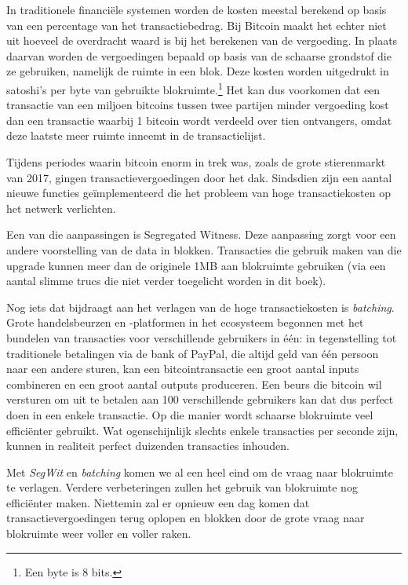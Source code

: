 In traditionele financiële systemen worden de kosten meestal berekend op basis van een percentage van het transactiebedrag. Bij Bitcoin maakt het echter niet uit hoeveel de overdracht waard is bij het berekenen van de vergoeding. In plaats daarvan worden de vergoedingen bepaald op basis van de schaarse grondstof die ze gebruiken, namelijk de ruimte in een blok. Deze kosten worden uitgedrukt in satoshi’s per byte van gebruikte blokruimte.\footnote{Een byte is 8 bits.} Het kan dus voorkomen dat een transactie van een miljoen bitcoins tussen twee partijen minder vergoeding kost dan een transactie waarbij 1 bitcoin wordt verdeeld over tien ontvangers, omdat deze laatste meer ruimte inneemt in de transactielijst.

Tijdens periodes waarin bitcoin enorm in trek was, zoals de grote stierenmarkt van 2017, gingen transactievergoedingen door het dak. Sindsdien zijn een aantal nieuwe functies geïmplementeerd die het probleem van hoge transactiekosten op het netwerk verlichten.

Een van die aanpassingen is \textquotedbl{}Segregated Witness\textquotedbl{}. Deze aanpassing zorgt voor een andere voorstelling van de data in blokken. Transacties die gebruik maken van die upgrade kunnen meer dan de originele 1MB aan blokruimte gebruiken (via een aantal slimme trucs die niet verder toegelicht worden in dit boek).

Nog iets dat bijdraagt aan het verlagen van de hoge transactiekosten is \textit{batching}. Grote handelsbeurzen en -platformen in het ecosysteem begonnen met het bundelen van transacties voor verschillende gebruikers in één: in tegenstelling tot traditionele betalingen via de bank of PayPal, die altijd geld van één persoon naar een andere sturen, kan een bitcointransactie een groot aantal inputs combineren en een groot aantal outputs produceren. Een beurs die bitcoin wil versturen om uit te betalen aan 100 verschillende gebruikers kan dat dus perfect doen in een enkele transactie. Op die manier wordt schaarse blokruimte veel efficiënter gebruikt. Wat ogenschijnlijk slechts enkele transacties per seconde zijn, kunnen in realiteit perfect duizenden transacties inhouden.

Met \textit{SegWit} en \textit{batching} komen we al een heel eind om de vraag naar blokruimte te verlagen. Verdere verbeteringen zullen het gebruik van blokruimte nog efficiënter maken. Niettemin zal er opnieuw een dag komen dat transactievergoedingen terug oplopen en blokken door de grote vraag naar blokruimte weer voller en voller raken.

